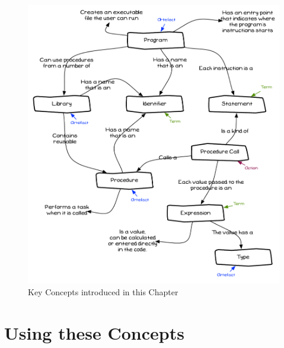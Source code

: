 \begin{figure}[h]
   \centering
   \includegraphics[width=\textwidth]{./topics/program-creation/diagrams/Summary} 
   \caption[Chapter Concepts]{Key Concepts introduced in this Chapter}
   \label{fig:program-creation-summary}
\end{figure}





\clearpage
\section{Using these Concepts} %
\label{sec:using_these_concepts_program_creation}

